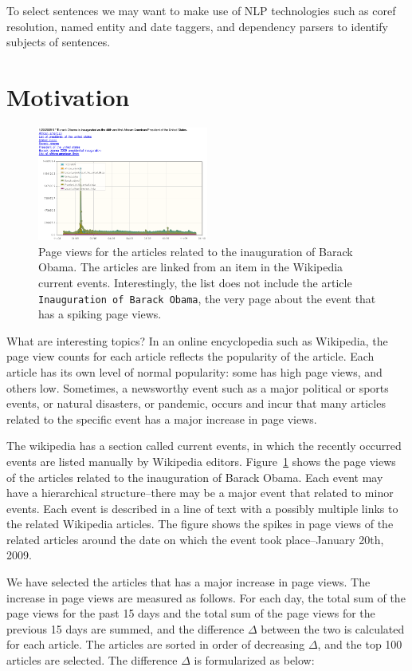 \documentclass[11pt]{article}
\newcommand{\war}[1]{{\tt\small #1}}
\begin{document}
To select sentences we may want to make use of NLP technologies such as coref resolution, named entity and date taggers, and dependency parsers to identify subjects of sentences.

\section{Motivation}

\begin{figure}
\centering
\includegraphics[width=0.5\textwidth]{figures/obama_sparkline.png}
\caption{Page views for the articles related to the inauguration of Barack Obama. The articles are linked from an item in the Wikipedia current events. Interestingly, the list does not include the article \war{Inauguration of Barack Obama}, the very page about the event that has a spiking page views.}
\label{fig:obama-sparkline}
\end{figure}

What are interesting topics? In an online encyclopedia such as Wikipedia, the page view counts for each article reflects the popularity of the article. Each article has its own level of normal popularity: some has high page views, and others low. Sometimes, a newsworthy event such as a major political or sports events, or natural disasters, or pandemic, occurs and incur that many articles related to the specific event has a major increase in page views.

The wikipedia has a section called current events, in which the recently occurred events are listed manually by Wikipedia editors. Figure~\ref{fig:obama-sparkline} shows the page views of the articles related to the inauguration of Barack Obama. Each event may have a hierarchical structure--there may be a major event that related to minor events. Each event is described in a line of text with a possibly multiple links to the related Wikipedia articles. The figure shows the spikes in page views of the related articles around the date on which the event took place--January 20th, 2009.

We have selected the articles that has a major increase in page views. The increase in page views are measured as follows. For each day, the total sum of the page views for the past 15 days and the total sum of the page views for the previous 15 days are summed, and the difference $\Delta$ between the two is calculated for each article. The articles are sorted in order of decreasing $\Delta$, and the top 100 articles are selected. The difference $\Delta$ is formularized as below:
\end{document}
